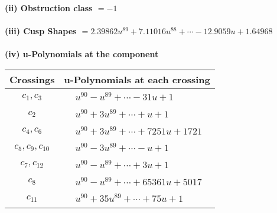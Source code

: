 \documentclass[1p]{elsarticle_modified}
\theoremstyle{definition}
\begin{document}
\flushleft \textbf{(ii) Obstruction class $= -1$}\\~\\
\flushleft \textbf{(iii) Cusp Shapes $= 2.39862 u^{89}+7.11016 u^{88}+\cdots-12.9059 u+1.64968$}\\~\\
\newpage\renewcommand{\arraystretch}{1}
\flushleft \textbf{(iv) u-Polynomials at the component}\newline \\
\begin{tabular}{m{50pt}|m{274pt}}
Crossings & \hspace{64pt}u-Polynomials at each crossing \\
\hline $$\begin{aligned}c_{1},c_{3}\end{aligned}$$&$\begin{aligned}
&u^{90}- u^{89}+\cdots-31 u+1
\end{aligned}$\\
\hline $$\begin{aligned}c_{2}\end{aligned}$$&$\begin{aligned}
&u^{90}+3 u^{89}+\cdots+u+1
\end{aligned}$\\
\hline $$\begin{aligned}c_{4},c_{6}\end{aligned}$$&$\begin{aligned}
&u^{90}+3 u^{89}+\cdots+7251 u+1721
\end{aligned}$\\
\hline $$\begin{aligned}c_{5},c_{9},c_{10}\end{aligned}$$&$\begin{aligned}
&u^{90}-3 u^{89}+\cdots- u+1
\end{aligned}$\\
\hline $$\begin{aligned}c_{7},c_{12}\end{aligned}$$&$\begin{aligned}
&u^{90}- u^{89}+\cdots+3 u+1
\end{aligned}$\\
\hline $$\begin{aligned}c_{8}\end{aligned}$$&$\begin{aligned}
&u^{90}- u^{89}+\cdots+65361 u+5017
\end{aligned}$\\
\hline $$\begin{aligned}c_{11}\end{aligned}$$&$\begin{aligned}
&u^{90}+35 u^{89}+\cdots+75 u+1
\end{aligned}$\\
\hline
\end{tabular}\\~\\
\end{document}
